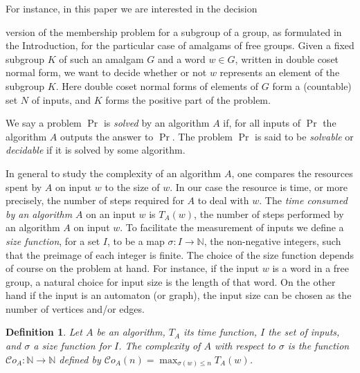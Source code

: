 \documentclass[a4paper,12pt]{article}
\newtheorem{definition}[theorem]{Definition}
\numberwithin{equation}{section}
\numberwithin{figure}{section}
\newcommand{\NN}{\ensuremath{\mathbb{N}}}
\newcommand{\FF}{\ensuremath{\mathbb{F}}}
\newcommand{\cC}{\mathcal{C}}
\begin{document}
For instance, in this paper we are interested in the decision

version%
 of the membership problem for a subgroup of a group, as formulated
in the Introduction, for the particular case of amalgams of free groups.
Given
 a fixed subgroup $K$ of such an amalgam $G$ and a word $w \in G$, written in
double coset normal form, we want to decide
whether or not $w$ represents an element of  the subgroup $K$.
Here double coset normal forms of elements of $G$ form a (countable)
set $N$ of inputs, and $K$ forms the positive part of the problem.

 We say a problem $\Pr$ is \emph{solved} by an algorithm $A$ if, for all inputs of $\Pr$ the
algorithm $A$ outputs the answer to $\Pr$. %
The problem $\Pr$ is said to be \emph{solvable} or \emph{decidable} if it is
solved by some algorithm.

 In general to study the complexity of an algorithm $A$,
one compares the resources spent by $A$ on input $w$ to the size of
$w$.
In our case the resource is time, or more precisely, the number
of steps required for $A$ to deal with $w$.
The \emph{time consumed by an algorithm $A$} on an input $w$ is
$T_{A}(w)$, the number of steps performed by an algorithm $A$ on
 input $w$. To facilitate the measurement of inputs we define a
 \emph{size function}, for a set $I$, to be a map $\sigma:I\to \mathbb N$, the
non-negative integers, such that the preimage of each integer is
finite.
The choice of the size function depends of course on the problem at hand.
For instance, if the input $w$ is a word in a free group, a natural
choice for input size is the length of that word.
On the other hand  if the input is
an automaton (or graph), the input size can be chosen as the number of vertices and/or edges.
\begin{definition}
Let $A$ be an algorithm, $T_{A}$ its time function, $I$ the set of
inputs, and $\sigma$ a size function for $I$. The \emph{ complexity of $A$} with respect to $\sigma$ is the function
$\cC o_{A}:\NN \to \NN$ defined by $\cC o_{A}(n)=\max_{\sigma(w)\le n}
T_{A}(w)$.
\end{definition}
\end{document}
